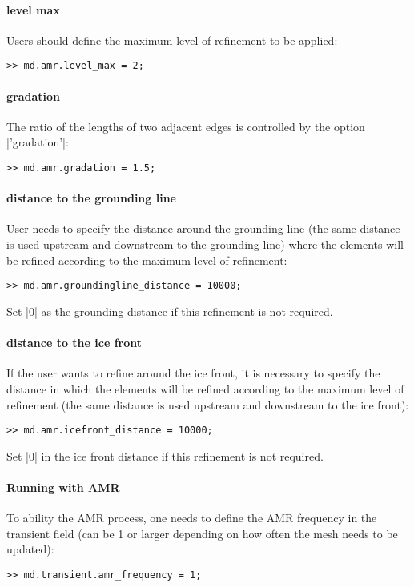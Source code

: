 \paragraph{level max}
Users should define the maximum level of refinement to be applied:
\begin{lstlisting}
>> md.amr.level_max = 2;
\end{lstlisting}

\paragraph{gradation}
The ratio of the lengths of two adjacent edges is controlled by the option \lstinlinebg|'gradation'|:
\begin{lstlisting}
>> md.amr.gradation = 1.5;
\end{lstlisting}

\paragraph{distance to the grounding line}
User needs to specify the distance around the grounding line (the same distance is used upstream and downstream to the grounding line) where the elements will be refined according to the maximum level of refinement:
\begin{lstlisting}
>> md.amr.groundingline_distance = 10000;
\end{lstlisting}
Set \lstinlinebg|0| as the grounding distance if this refinement is not required.

\paragraph{distance to the ice front}
If the user wants to refine around the ice front, it is necessary to specify the distance in which the elements will be refined according to the maximum level of refinement (the same distance is used upstream and downstream to the ice front):
\begin{lstlisting}
>> md.amr.icefront_distance = 10000;
\end{lstlisting}
Set \lstinlinebg|0| in the ice front distance if this refinement is not required.
\paragraph{Running with AMR}%
To ability the AMR process, one needs to define the AMR frequency in the transient field (can be 1 or larger depending on how often the mesh needs to be updated):
\begin{lstlisting}
>> md.transient.amr_frequency = 1;
\end{lstlisting}

\clearpage %
